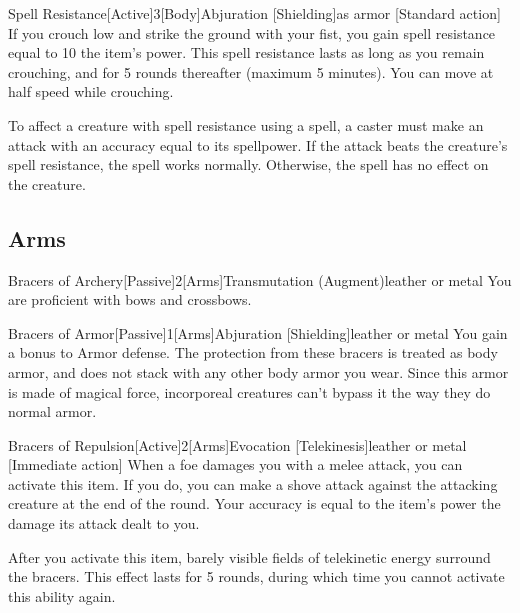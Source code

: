         \begin{magicitemdef}{Spell Resistance}[Active]{3}[Body]{Abjuration [Shielding]}{as armor}
            [Standard action] If you crouch low and strike the ground with your fist, you gain spell resistance equal to 10 \add the item's power.
            This spell resistance lasts as long as you remain crouching, and for 5 rounds thereafter (maximum 5 minutes).
            You can move at half speed while crouching.

            To affect a creature with spell resistance using a spell, a caster must make an attack with an accuracy equal to its spellpower.
            If the attack beats the creature's spell resistance, the spell works normally.
            Otherwise, the spell has no effect on the creature.
        \end{magicitemdef}

    \subsection{Arms}

        \begin{magicitemdef}{Bracers of Archery}[Passive]{2}[Arms]{Transmutation (Augment)}{leather or metal}
             You are proficient with bows and crossbows.
        \end{magicitemdef}

        \begin{magicitemdef}{Bracers of Armor}[Passive]{1}[Arms]{Abjuration [Shielding]}{leather or metal}
             You gain a  bonus to Armor defense.
            The protection from these bracers is treated as body armor, and does not stack with any other body armor you wear.
            Since this armor is made of magical force, incorporeal creatures can't bypass it the way they do normal armor.
        \end{magicitemdef}

        \begin{magicitemdef}{Bracers of Repulsion}[Active]{2}[Arms]{Evocation [Telekinesis]}{leather or metal}
            [Immediate action] When a foe damages you with a melee attack, you can activate this item.
            If you do, you can make a shove attack against the attacking creature at the end of the round.
            Your accuracy is equal to the item's power \add the damage its attack dealt to you.

            After you activate this item, barely visible fields of telekinetic energy surround the bracers.
            This effect lasts for 5 rounds, during which time you cannot activate this ability again.
        \end{magicitemdef}

